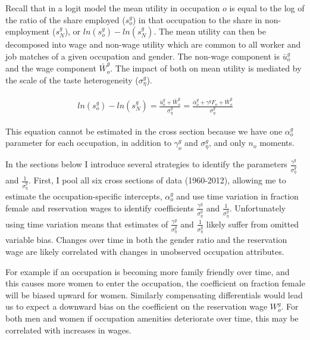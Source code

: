 \documentclass[12pt]{article}
\begin{document}

Recall that in a logit model the mean utility in occupation $o$ is equal to the log of the ratio of the share employed ($s^g_o$) in that occupation to the share in non-employment ($s^g_N$), or $ ln(s^g_o) - ln(s^g_N) $. The mean utility can then be decomposed into wage and non-wage utility which are common to all worker and job matches of a given occupation and gender. The non-wage component is $\bar{u}^{g}_o$ and the wage component $\bar{W}^g_o$. The impact of both on mean utility is mediated by the scale of the taste heterogeneity ($\sigma^g_{\eta}$).

\begin{align*}
     ln(s^g_o) - ln(s^g_N) = \frac{\bar{u}^{g}_o + \bar{W}^g_o}{ \sigma^g_{\eta} } = \frac{\bar{\alpha}^{g}_o + \gamma^g F_o  + \bar{W}^g_o}{ \sigma^g_{\eta} } 
\end{align*}



This equation cannot be estimated in the cross section because we have one $\alpha^g_o$ parameter for each occupation, in addition to $\gamma^g_o$ and $\sigma^g_{\eta}$, and only $n_o$ moments.

In the sections below I introduce several strategies to identify the parameters $\frac{\gamma^g}{\sigma^g_{\eta}}$ and $\frac{1}{\sigma^g_{\eta}}$. First, I pool all six cross sections of data (1960-2012), allowing me to estimate the occupation-specific intercepts, $\alpha^g_o$ and use time variation in fraction female and reservation wages to identify coefficients $\frac{\gamma^g}{\sigma^g_{\eta}}$ and $\frac{1}{\sigma^g_{\eta}}$. Unfortunately using time variation means that estimates of $\frac{\gamma^g}{\sigma^g_{\eta}}$ and $\frac{1}{\sigma^g_{\eta}}$ likely suffer from omitted variable bias. Changes over time in both the gender ratio and the reservation wage are likely correlated with changes in unobserved occupation attributes. 

For example if an occupation is becoming more family friendly over time, and this causes more women to enter the occupation, the coefficient on fraction female will be biased upward for women. Similarly compensating differentials would lead us to expect a downward bias on the coefficient on the reservation wage $W^g_o$. For both men and women if occupation amenities deteriorate over time, this may be correlated with increases in wages.
\end{document}
